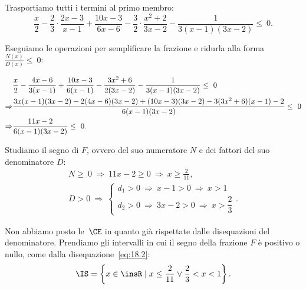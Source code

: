 \begin{exrig}
\begin{esempio}
Trasportiamo tutti i termini al primo membro:
\[\frac{x}{2}-\frac{2}{3}\cdot\frac{2x-3}{x-1}+\frac{10x-3}{6x-6}-\frac{3}{2}\cdot\frac{x^{2}+2}{3x-2}-\frac{1}{3(x-1)(3x-2)}\le~0.\]

Eseguiamo le operazioni per semplificare la frazione e ridurla alla
forma~$\frac{N(x)}{D(x)}\le~0$:

\begin{align}
  &\frac{x}{2}-\frac{4x-6}{3(x-1)}+\frac{10x-3}{6(x-1)}-\frac{3x^{2}+6}{2(3x-2)}-\frac{1}{3(x-1)(3x-2)}\le~0\notag\\
  \Rightarrow &\frac{3x(x-1)(3x-2)-2(4x-6)(3x-2)+(10x-3)(3x-2)-3(3x^{2}+6)(x-1)-2}{6(x-1)(3x-2)}\le~0\notag\\
  \Rightarrow &\frac{11x-2}{6(x-1)(3x-2)}\le~0. \label{eq:18.2}
\end{align}

Studiamo il segno di $F$, ovvero del suo numeratore $N$ e dei fattori del suo denominatore $D$:
 \[\begin{gathered}N\ge~0\:\Rightarrow\: 11x-2\ge 0\:\Rightarrow\: x\ge\frac{2}{11}\text{,}\\
		  D>0\:\Rightarrow\:\left\{\begin{array}{l}
			d_{1}>0\:\Rightarrow\: x-1>0\:\Rightarrow\: x>1\\
			d_{2}>0\:\Rightarrow\: 3x-2>0\:\Rightarrow\: x>\dfrac{2}{3}
			\end{array}\right.. \end{gathered}\]
\begin{center}

\end{center}
\pagebreak
Non abbiamo posto le~$\CE$ in quanto già rispettate dalle disequazioni
del denominatore. Prendiamo gli intervalli in cui il segno della frazione $F$ è positivo o
nullo, come dalla disequazione~\ref{eq:18.2}:
\[\IS=\left\{x\in \insR\mid x\le\frac{2}{11}\vee \frac{2}{3}<x<1\right\}.\]
 \end{esempio}
\end{exrig}
\ovalbox{\risolvii \ref{ese:18.57}, \ref{ese:18.58}, \ref{ese:18.59}, \ref{ese:18.60}, \ref{ese:18.61}, \ref{ese:18.62}, \ref{ese:18.63}, \ref{ese:18.64}, \ref{ese:18.65}, \ref{ese:18.66}, \ref{ese:18.67}}

\vspazio\ovalbox{\ref{ese:18.68}, \ref{ese:18.69}, \ref{ese:18.70}, \ref{ese:18.71}, \ref{ese:18.72}, \ref{ese:18.73}, \ref{ese:18.74}, \ref{ese:18.75}, \ref{ese:18.76}}
\newpage

\cleardoublepage
